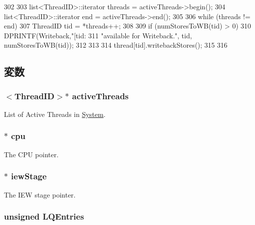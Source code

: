 \begin{DoxyCode}
302 {
303     list<ThreadID>::iterator threads = activeThreads->begin();
304     list<ThreadID>::iterator end = activeThreads->end();
305 
306     while (threads != end) {
307         ThreadID tid = *threads++;
308 
309         if (numStoresToWB(tid) > 0) {
310             DPRINTF(Writeback,"[tid:%
311                 "available for Writeback.\n", tid, numStoresToWB(tid));
312         }
313 
314         thread[tid].writebackStores();
315     }
316 }
\end{DoxyCode}


\subsection{変数}
\hypertarget{classLSQ_af6eaea53db532812052f71bf0380dab5}{
\subsubsection[{activeThreads}]{$<${\bf ThreadID}$>$$\ast$ {\bf activeThreads}}}
\label{classLSQ_af6eaea53db532812052f71bf0380dab5}
List of Active Threads in \hyperlink{classSystem}{System}. \hypertarget{classLSQ_a1379cf882a12ac6fc9eba5da7c84b18b}{
\subsubsection[{cpu}]{$\ast$ {\bf cpu}}}
\label{classLSQ_a1379cf882a12ac6fc9eba5da7c84b18b}
The CPU pointer. \hypertarget{classLSQ_a4e9ef25d8913b270d432be4bbfe4965c}{
\subsubsection[{iewStage}]{$\ast$ {\bf iewStage}}}
\label{classLSQ_a4e9ef25d8913b270d432be4bbfe4965c}
The IEW stage pointer. \hypertarget{classLSQ_aafa99d800d574095881acbacdbbbcc47}{
\subsubsection[{LQEntries}]{\setlength{\rightskip}{0pt plus 5cm}unsigned {\bf LQEntries}}}
